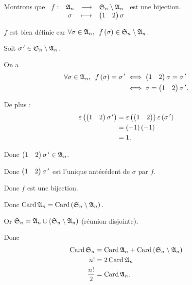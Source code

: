\begin{corr}[2]
Montrons que \(\begin{array}[t]{cccc}f : & \frak{A}_{n} & \longrightarrow & \frak{S}_{n}\setminus\frak{A}_{n} \\ & \sigma & \longmapsto & \begin{pmatrix}1 & 2\end{pmatrix}\sigma\end{array}\) est une bijection.

\(f\) est bien définie car \(\quantifs{\forall\sigma\in\frakA{n}}f\paren{\sigma}\in\S{n}\excluant\frakA{n}\).

Soit \(\sigma^{\,\prime}\in\frak{S}_{n}\setminus\frak{A}_{n}\).

On a \[\begin{aligned}
\quantifs{\forall\sigma\in\frakA{n}}f\paren{\sigma}=\sigma\prim&\ssi\begin{pmatrix}1 & 2\end{pmatrix}\sigma=\sigma\prim \\
&\ssi\sigma=\begin{pmatrix}1 & 2\end{pmatrix}\sigma\prim.
\end{aligned}\]

De plus : \[\begin{aligned}
\varepsilon\left(\begin{pmatrix}1 & 2\end{pmatrix}\sigma^{\,\prime}\right)&=\varepsilon\left(\begin{pmatrix}1 & 2\end{pmatrix}\right)\varepsilon\left(\sigma^{\,\prime}\right) \\
&=\left(-1\right)\left(-1\right) \\
&=1.
\end{aligned}\]

Donc \(\begin{pmatrix}1 & 2\end{pmatrix}\sigma^{\,\prime}\in\frak{A}_{n}\).

Donc \(\begin{pmatrix}1 & 2\end{pmatrix}\sigma^{\,\prime}\) est l'unique antécédent de \(\sigma\) par \(f\).

Donc \(f\) est une bijection.

Donc \(\operatorname{Card}\frak{A}_{n}=\operatorname{Card}\left(\frak{S}_{n}\setminus\frak{A}_{n}\right)\).

Or \(\frak{S}_{n}=\frak{A}_{n}\cup\left(\frak{S}_{n}\setminus\frak{A}_{n}\right)\) (réunion disjointe).

Donc \[\begin{aligned}
\operatorname{Card}\frak{S}_{n}&=\operatorname{Card}\frak{A}_{n}+\operatorname{Card}\left(\frak{S}_{n}\setminus\frak{A}_{n}\right) \\
n!&=2\operatorname{Card}\frak{A}_{n} \\
\dfrac{n!}{2}&=\operatorname{Card}\frak{A}_{n}.
\end{aligned}\]
\end{corr}

